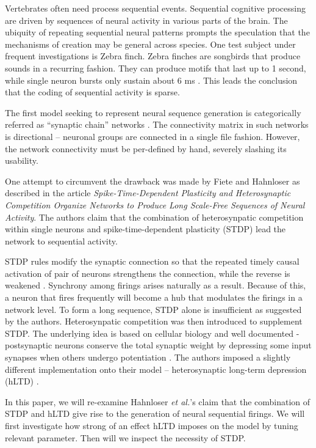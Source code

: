 Vertebrates often need process sequential events. Sequential cognitive processing are driven by sequences of neural activity in various parts of the brain. The ubiquity of repeating sequential neural patterns prompts the speculation that the mechanisms of creation may be general across species. One test subject under frequent investigations is Zebra finch. Zebra finches are songbirds that produce sounds in a recurring fashion.  They can produce motifs that last up to 1 second, while single neuron bursts only sustain about 6 ms \cite{Hahnloser2002}. This leads the conclusion that the coding of sequential activity is sparse. 

The first model seeking to represent neural sequence generation is categorically referred as “synaptic chain” networks \cite{Kleinfeld1988}. The connectivity matrix in such networks is directional – neuronal groups are connected in a single file fashion. However, the network connectivity must be per-defined by hand, severely slashing its usability. 

One attempt to circumvent the drawback was made by Fiete and Hahnloser as described in the article \textit{Spike-Time-Dependent Plasticity and Heterosynaptic Competition Organize Networks to Produce Long Scale-Free Sequences of Neural Activity}. The authors claim that the combination of heterosynpatic competition within single neurons and spike-time-dependent plasticity (STDP) lead the network to sequential activity. 

STDP rules modify the synaptic connection so that the repeated timely causal activation of pair of neurons strengthens the connection, while the reverse is weakened \cite{Abbott2000}. Synchrony among firings arises naturally as a result. Because of this, a neuron that fires frequently will become a hub that modulates the firings in a network level. To form a long sequence, STDP alone is insufficient as suggested by the authors. Heterosynpatic competition was then introduced to supplement STDP. The underlying idea is  based on cellular biology and well documented - postsynaptic neurons conserve the total synaptic weight by depressing some input synapses when others undergo potentiation \cite{Royer2003}. The authors imposed a slightly different implementation onto their model – heterosynaptic long-term depression (hLTD) .


In this paper, we will re-examine Hahnloser \textit{et al.}'s claim that the combination of STDP and hLTD give rise to the generation of neural sequential firings. We will first investigate how strong of an effect hLTD imposes on the model by tuning relevant parameter. Then will we inspect the necessity of  STDP. 
